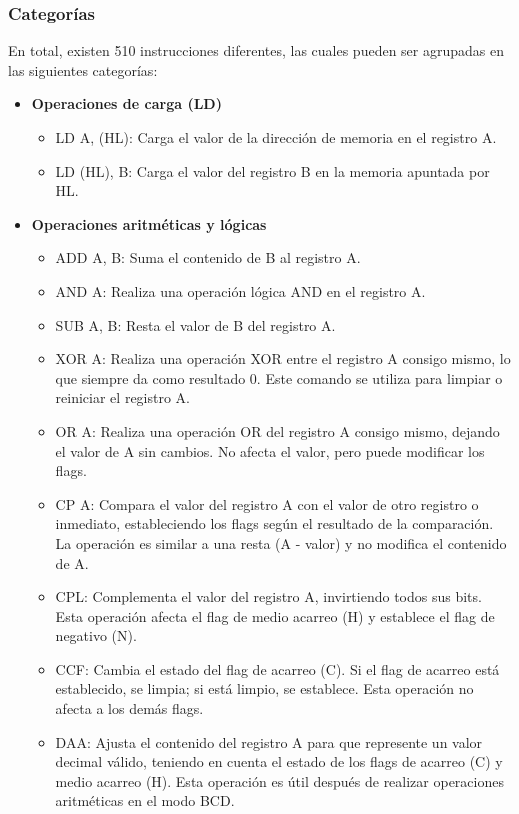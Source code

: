 \subsubsection{Categorías}

En total, existen 510 instrucciones diferentes, las cuales pueden ser agrupadas en las siguientes categorías:
\begin{itemize}
  \item \textbf{Operaciones de carga (LD)}
  \begin{itemize}
  \item LD A, (HL): Carga el valor de la dirección de memoria en el registro A.
  \item LD (HL), B: Carga el valor del registro B en la memoria apuntada por HL.
  \end{itemize}
  \item \textbf{Operaciones aritméticas y lógicas}
  \begin{itemize}
  \item ADD A, B: Suma el contenido de B al registro A.
  \item AND A: Realiza una operación lógica AND en el registro A.
  \item SUB A, B: Resta el valor de B del registro A.
  \item XOR A: Realiza una operación XOR entre el registro A consigo mismo, lo que siempre da como resultado 0. Este comando se utiliza para limpiar o reiniciar el registro A.
  \item OR A: Realiza una operación OR del registro A consigo mismo, dejando el valor de A sin cambios. No afecta el valor, pero puede modificar los flags.
  \item CP A: Compara el valor del registro A con el valor de otro registro o inmediato, estableciendo los flags según el resultado de la comparación. La operación es similar a una resta (A - valor) y no modifica el contenido de A.
  \item CPL: Complementa el valor del registro A, invirtiendo todos sus bits. Esta operación afecta el flag de medio acarreo (H) y establece el flag de negativo (N).
  \item CCF: Cambia el estado del flag de acarreo (C). Si el flag de acarreo está establecido, se limpia; si está limpio, se establece. Esta operación no afecta a los demás flags.
  \item DAA: Ajusta el contenido del registro A para que represente un valor decimal válido, teniendo en cuenta el estado de los flags de acarreo (C) y medio acarreo (H). Esta operación es útil después de realizar operaciones aritméticas en el modo BCD.

\end{itemize}
\end{itemize}
